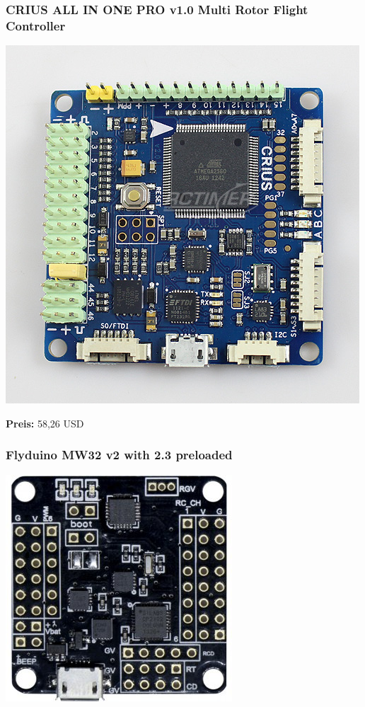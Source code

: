 \documentclass[12pt,a4paper]{article}
\begin{document}
\subsubsection*{CRIUS ALL IN ONE PRO v1.0 Multi Rotor Flight Controller}
\includegraphics[scale=0.3]{Bilder/crius.jpg}

\textbf{Preis:} 58,26 USD

\subsubsection*{Flyduino MW32 v2 with 2.3 preloaded}
\includegraphics[scale=0.4]{Bilder/MultikopterFC2.jpg}
\end{document}
